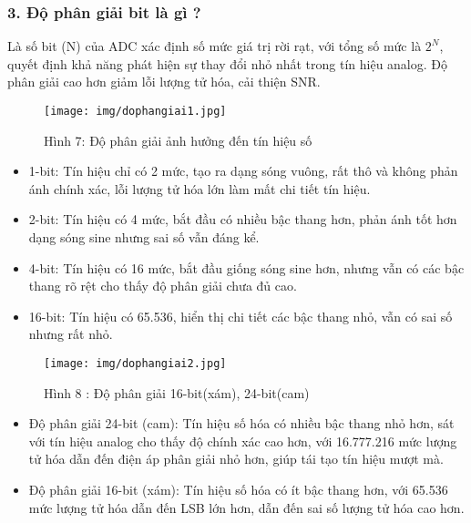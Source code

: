 \documentclass[a4paper,13pt]{article}
\begin{document}
\subsubsection*{3. Độ phân giải bit  là gì ?}
Là số bit (N) của ADC xác định số mức giá trị rời rạt, với tổng số mức là \(2^N\), quyết định khả năng phát hiện sự thay đổi nhỏ nhất trong tín hiệu analog. Độ phân giải cao hơn giảm lỗi lượng tử hóa, cải thiện SNR.
\begin{figure}[htbp]
    \centering
    \texttt{[image: img/dophangiai1.jpg]}
    \caption*{Hình 7: Độ phân giải ảnh hưởng đến tín hiệu số \cite{key4} }
    \label{fig:model}
\end{figure}
\begin{itemize}
    \item 1-bit: Tín hiệu chỉ có 2 mức, tạo ra dạng sóng vuông, rất thô và không phản ánh chính xác, lỗi lượng tử hóa lớn làm mất chi tiết tín hiệu.
    \item 2-bit: Tín hiệu có 4 mức, bắt đầu có nhiều bậc thang hơn, phản ánh tốt hơn dạng sóng sine nhưng sai số vẫn đáng kể.
    \item 4-bit: Tín hiệu có 16 mức, bắt đầu giống sóng sine hơn, nhưng vẫn có các bậc thang rõ rệt cho thấy độ phân giải chưa đủ cao.
    \item 16-bit: Tín hiệu có 65.536, hiển thị chi tiết các bậc thang nhỏ, vẫn có sai số nhưng rất nhỏ.
\end{itemize}
\begin{figure}[htbp]
    \centering
    \texttt{[image: img/dophangiai2.jpg]}
    \caption*{Hình 8 : Độ phân giải 16-bit(xám), 24-bit(cam) \cite{key2} }
    \label{fig:model}
\end{figure}
\begin{itemize}
    \item Độ phân giải 24-bit (cam): Tín hiệu số hóa có nhiều bậc thang nhỏ hơn, sát với tín hiệu analog cho thấy độ chính xác cao hơn, với 16.777.216 mức lượng tử hóa dẫn đến điện áp phân giải nhỏ hơn, giúp tái tạo tín hiệu mượt mà.
    \item Độ phân giải 16-bit (xám): Tín hiệu số hóa có ít bậc thang hơn, với 65.536 mức lượng tử hóa dẫn đến LSB lớn hơn, dẫn đến sai số lượng tử hóa cao hơn.
\end{itemize}
\end{document}
